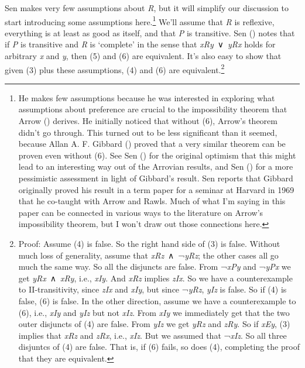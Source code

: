 \documentclass[
  11pt,
  letterpaper,
  DIV=11,
  numbers=noendperiod,
  twoside]{scrartcl}
\begin{document}
Sen makes very few assumptions about \emph{R}, but it will simplify our
discussion to start introducing some assumptions here.\footnote{He makes
  few assumptions because he was interested in exploring what
  assumptions about preference are crucial to the impossibility theorem
  that Arrow () derives. He initially
  noticed that without (6), Arrow's theorem didn't go through. This
  turned out to be less significant than it seemed, because Allan A. F.
  Gibbard () proved that a very similar
  theorem can be proven even without (6). See Sen
  () for the original optimism that this
  might lead to an interesting way out of the Arrovian results, and Sen
  () for a more pessimistic
  assessment in light of Gibbard's result. Sen reports that Gibbard
  originally proved his result in a term paper for a seminar at Harvard
  in 1969 that he co-taught with Arrow and Rawls. Much of what I'm
  saying in this paper can be connected in various ways to the
  literature on Arrow's impossibility theorem, but I won't draw out
  those connections here.} We'll assume that \emph{R} is reflexive,
everything is at least as good as itself, and that \emph{P} is
transitive. Sen () notes
that if \emph{P} is transitive and \emph{R} is `complete' in the sense
that \emph{xRy}~∨~\emph{yRx} holds for arbitrary \emph{x} and \emph{y},
then (5) and (6) are equivalent. It's also easy to show that given (3)
plus these assumptions, (4) and (6) are equivalent.\footnote{Proof:
  Assume (4) is false. So the right hand side of (3) is false. Without
  much loss of generality, assume that \emph{xRz}~∧~¬\emph{yRz}; the
  other cases all go much the same way. So all the disjuncts are false.
  From ¬\emph{xPy} and ¬\emph{yPx} we get \emph{yRx}~∧~\emph{xRy}, i.e.,
  \emph{xIy}. And \emph{xRz} implies \emph{zIx}. So we have a
  counterexample to II-transitivity, since \emph{zIx} and \emph{xIy},
  but since ¬\emph{yRz}, \emph{yIz} is false. So if (4) is false, (6) is
  false. In the other direction, assume we have a counterexample to (6),
  i.e., \emph{xIy} and \emph{yIz} but not \emph{xIz}. From \emph{xIy} we
  immediately get that the two outer disjuncts of (4) are false. From
  \emph{yIz} we get \emph{yRz} and \emph{zRy}. So if \emph{xEy}, (3)
  implies that \emph{xRz} and \emph{zRx}, i.e., \emph{xIz}. But we
  assumed that ¬\emph{xIz}. So all three disjuntcs of (4) are false.
  That is, if (6) fails, so does (4), completing the proof that they are
  equivalent.}
\end{document}
